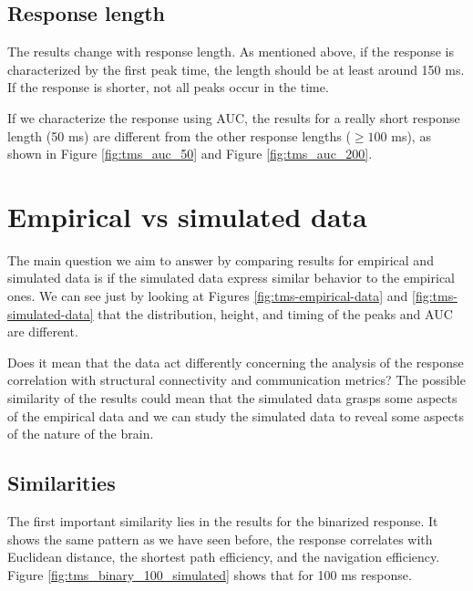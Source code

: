 \subsection{Response length}

The results change with response length. As mentioned above, if the response is characterized by the first peak time, the length should be at least around 150 ms. If the response is shorter, not all peaks occur in the time. 

If we characterize the response using AUC, the results for a really short response length (50 ms) are different from the other response lengths ($\geq100$ ms), as shown in Figure \ref{fig:tms_auc_50} and Figure \ref{fig:tms_auc_200}.

\section{Empirical vs simulated data}

The main question we aim to answer by comparing results for empirical and simulated data is if the simulated data express similar behavior to the empirical ones. We can see just by looking at Figures \ref{fig:tms-empirical-data} and \ref{fig:tms-simulated-data} that the distribution, height, and timing of the peaks and AUC are different. 

Does it mean that the data act differently concerning the analysis of the response correlation with structural connectivity and communication metrics? The possible similarity of the results could mean that the simulated data grasps some aspects of the empirical data and we can study the simulated data to reveal some aspects of the nature of the brain.

\subsection{Similarities}

The first important similarity lies in the results for the binarized response. It shows the same pattern as we have seen before, the response correlates with Euclidean distance, the shortest path efficiency, and the navigation efficiency. Figure \ref{fig:tms_binary_100_simulated} shows that for 100 ms response. 

